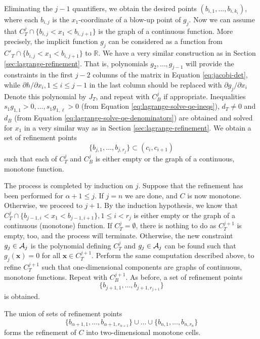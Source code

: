 \documentclass[
]{book}
\theoremstyle{definition}
\theoremstyle{definition}
\theoremstyle{definition}
\theoremstyle{definition}
\theoremstyle{remark}
\begin{document}
Eliminating the \(j-1\) quantifiers, we obtain the desired points \((b_{i,1},\ldots,b_{i,k_i})\), where each \(b_{i,j}\) is the \(x_1\)-coordinate of a blow-up point of \(g_j\).
Now we can assume that \(C^j_T\cap \{ b_{i,j} < x_1 < b_{i,j+1}\}\) is the graph of a continuous function. More precisely, the implicit function \(g_j\) can be considered as a function from \(C'_T \cap \{ b_{i,j} < x_1 < b_{i,j+1}\}\) to \(\mathbb{R}\). We have a very similar construction as in Section \ref{sec:lagrange-refinement}.
That is, polynomials \(g_2,\ldots,g_{j-1}\) will provide the constraints in the first \(j-2\) columns of the matrix in Equation \eqref{eq:jacobi-det}, while \(\partial h / \partial x_i, 1 \le i \le j - 1\) in the last column should be replaced with \(\partial g_j / \partial x_i\)
Denote this polynomial by \(J_T\), and repeat with \(C^j_B\) if appropriate. Inequalities \(s_1 g_{1,1} > 0, \ldots, s_1 g_{1,\ell} > 0\) (from Equation \eqref{eq:lagrange-solve-qe-ineqs}), \(d_T \ne 0\) and \(d_B\) (from Equation \eqref{eq:lagrange-solve-qe-denominators}) are obtained and solved for \(x_1\) in a very similar way as in Section \ref{sec:lagrange-refinement}. We obtain a set of refinement points
\[
\{ b_{j,1}, \ldots, b_{j,r_j} \} \subset (c_i,c_{i+1})
\]
such that each of \(C^j_T\) and \(C^j_B\) is either empty or the graph of a continuous, monotone function.

The process is completed by induction on \(j\). Suppose that the refinement has been performed for \(\alpha + 1 \le j\). If \(j = n\) we are done, and \(C\) is now monotone. Otherwise, we proceed to \(j+1\). By the induction hypothesis, we know that \(C^{j}_T \cap \{b_{j-1,i} < x_1 < b_{j-1,i+1}\}, 1 \le i < r_{j}\) is either empty or the graph of a continuous (monotone) function.
If \(C^{j}_T = \emptyset\), there is nothing to do as \(C^{j+1}_T\) is empty, too, and the process will terminate.
Otherwise, the new constraint \(g_{j} \in {\cal A}_{j}\) is the polynomial defining \(C^{j}_T\) and \(g_j \in {\cal A}_j\) can be found such that \(g_j(\mathbf{x}) = 0\) for all \(\mathbf{x} \in C^{j+1}_T\).
Perform the same computation described above, to refine \(C^{j+1}_T\) such that one-dimensional components are graphs of continuous, monotone functions. Repeat with \(C^{j+1}_B\).
As before, a set of refinement points
\[
\{b_{j+1,1}, \ldots, b_{j+1,r_{j+1}}\}
\]
is obtained.

The union of sets of refinement points \[
\{b_{\alpha + 1,1}, \ldots, b_{\alpha + 1,r_{\alpha + 1}}\} \cup \ldots \cup \{b_{n,1}, \ldots, b_{n,r_n}\}
\]
forms the refinement of \(C\) into two-dimensional monotone cells.
\end{document}
